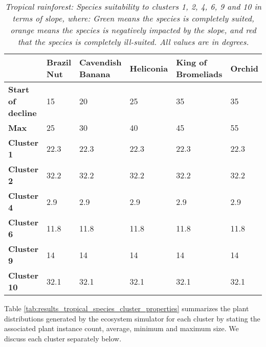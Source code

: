 \begin{table}[htb!]
  \centering
	    \begin{tabular}{|p{2cm}|p{2.5cm}|p{2.5cm}|p{2.5cm}|p{2.5cm}|p{2.5cm}|}
		\hline	
  	     & \textbf{Brazil Nut} & \textbf{Cavendish Banana} & \textbf{Heliconia} & \textbf{King of Bromeliads} & \textbf{Orchid} \\
  	    \hline	
		\textbf{Start of decline} & 
		15 & 
		20 & 
		25 &
		35 & 
		35 \\
		\hline
		\textbf{Max} & 
		25 &
		30 &
		40 &
		45 & 
		55 \\
		\hline
		\textbf{Cluster 1} & 
		\cellcolor{color_orange}22.3 &
		\cellcolor{color_orange}22.3 &
		\cellcolor{color_green}22.3 &
		\cellcolor{color_green}22.3 &
		\cellcolor{color_green}22.3 \\
		\hline
		\textbf{Cluster 2} & 
		\cellcolor{color_red}32.2 &
		\cellcolor{color_red}32.2 &
		\cellcolor{color_orange}32.2 &
		\cellcolor{color_green}32.2 &
		\cellcolor{color_green}32.2 \\
		\hline
		\textbf{Cluster 4} & 
		\cellcolor{color_green}2.9 & 
		\cellcolor{color_green}2.9 &
		\cellcolor{color_green}2.9 &
		\cellcolor{color_green}2.9 &
		\cellcolor{color_green}2.9 \\
		\hline
		\textbf{Cluster 6} & 
		\cellcolor{color_green}11.8 & 
		\cellcolor{color_green}11.8 &
		\cellcolor{color_green}11.8 &
		\cellcolor{color_green}11.8 &
		\cellcolor{color_green}11.8 \\
		\hline
		\textbf{Cluster 9} & 
		\cellcolor{color_green}14 & 
		\cellcolor{color_green}14 &
		\cellcolor{color_green}14 &
		\cellcolor{color_green}14 &
		\cellcolor{color_green}14 \\
		\hline
		\textbf{Cluster 10} & 
		\cellcolor{color_red}32.1 & 
		\cellcolor{color_red}32.1 &
		\cellcolor{color_orange}32.1 &
		\cellcolor{color_green}32.1 &
		\cellcolor{color_green}32.1 \\
		\hline
		\end{tabular}
		\caption{\textit{Tropical rainforest: Species suitability to clusters 1, 2, 4, 6, 9 and 10 in terms of slope, where: Green means the species is completely suited, orange means the species is negatively impacted by the slope, and red that the species is completely ill-suited. All values are in \textit{degrees}.}}
	  \label{tab:results_tropical_species_slope_suitability}
\end{table}

Table \ref{tab:results_tropical_species_cluster_properties} summarizes the plant distributions generated by the ecosystem simulator for each cluster by stating the associated plant instance count, average, minimum and maximum size. We discuss each cluster separately below. \\

